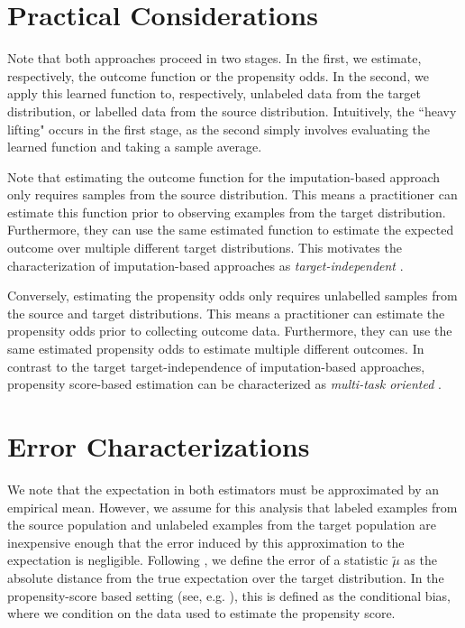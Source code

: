 \documentclass{article} %
\begin{document}
\section{Practical Considerations}
Note that both approaches proceed in two stages. In the first, we estimate, respectively, the outcome function or the propensity odds. In the second, we apply this learned function to, respectively, unlabeled data from the target distribution, or labelled data from the source distribution. Intuitively, the ``heavy lifting" occurs in the first stage, as the second simply involves evaluating the learned function and taking a sample average.

Note that estimating the outcome function for the imputation-based approach only requires samples from the source distribution. This means a practitioner can estimate this function prior to observing examples from the target distribution. Furthermore, they can use the same estimated function to estimate the expected outcome over multiple different target distributions. This motivates the characterization of imputation-based approaches as \emph{target-independent} \citep{kim2022universal}.

Conversely, estimating the propensity odds only requires unlabelled samples from the source and target distributions. This means a practitioner can estimate the propensity odds prior to collecting outcome data. Furthermore, they can use the same estimated propensity odds to estimate multiple different outcomes. In contrast to the target target-independence of imputation-based approaches, propensity score-based estimation can be characterized as \emph{multi-task oriented} \citep{wang2022functional}. 



\section{Error Characterizations}
We note that the expectation in both estimators must be approximated by an empirical mean. However, we assume for this analysis that labeled examples from the source population and unlabeled examples from the target population are inexpensive enough that the error induced by this approximation to the expectation is negligible. Following \cite{kim2022universal}, we define the error of a statistic $\tilde{\mu}$ as the absolute distance from the true expectation over the target distribution. In the propensity-score based setting (see, e.g. \cite{Kallus2020}), this is defined as the conditional bias, where we condition on the data used to estimate the propensity score.
\end{document}
